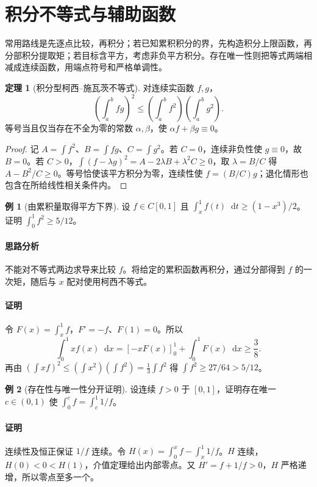 \documentclass[UTF8,fontset=fandol,12pt,oneside,openany]{ctexrep}
\newcommand{\dd}{\mathop{}\!\mathrm d}
\theoremstyle{definition}
\newtheorem{theorem}{定理}[chapter]
\newtheorem{example}{例}[chapter]
\begin{document}
\section{积分不等式与辅助函数}
\label{lec:11:inequality}
常用路线是先逐点比较，再积分；若已知累积积分的界，先构造积分上限函数，再分部积分提取矩；若目标含平方，考虑非负平方积分。存在唯一性则把等式两端相减成连续函数，用端点符号和严格单调性。
\begin{theorem}[积分型柯西--施瓦茨不等式]
对连续实函数 $f,g$，
\[\left(\int_a^bfg\right)^2\le\left(\int_a^bf^2\right)\left(\int_a^bg^2\right).\]
等号当且仅当存在不全为零的常数 $\alpha,\beta$，使 $\alpha f+\beta g\equiv0$。
\end{theorem}
\begin{proof}
记 $A=\int f^2$、$B=\int fg$、$C=\int g^2$。若 $C=0$，连续非负性使 $g\equiv0$，故 $B=0$。若 $C>0$，$\int(f-\lambda g)^2=A-2\lambda B+\lambda^2C\ge0$，取 $\lambda=B/C$ 得 $A-B^2/C\ge0$。等号恰使该平方积分为零，连续性使 $f=(B/C)g$；退化情形也包含在所给线性相关条件内。
\end{proof}
\begin{example}[由累积量取得平方下界]
设 $f\in C[0,1]$ 且 $\int_x^1f(t)\dd t\ge(1-x^3)/2$。证明 $\int_0^1f^2\ge5/12$。
\end{example}
\paragraph{思路分析} 不能对不等式两边求导来比较 $f$。将给定的累积函数再积分，通过分部得到 $f$ 的一次矩，随后与 $x$ 配对使用柯西不等式。
\paragraph{证明} 令 $F(x)=\int_x^1f$，$F'=-f$、$F(1)=0$。所以
\[\int_0^1xf(x)\dd x=[-xF(x)]_0^1+\int_0^1F(x)\dd x\ge\frac38.\]
再由 $(\int xf)^2\le(\int x^2)(\int f^2)=\frac13\int f^2$ 得 $\int f^2\ge27/64>5/12$。

\begin{example}[存在性与唯一性分开证明]
设连续 $f>0$ 于 $[0,1]$，证明存在唯一 $c\in(0,1)$ 使 $\int_0^cf=\int_c^1 1/f$。
\end{example}
\paragraph{证明} 连续性及恒正保证 $1/f$ 连续。令 $H(x)=\int_0^xf-\int_x^1 1/f$。$H$ 连续，$H(0)<0<H(1)$，介值定理给出内部零点。又 $H'=f+1/f>0$，$H$ 严格递增，所以零点至多一个。
\end{document}
